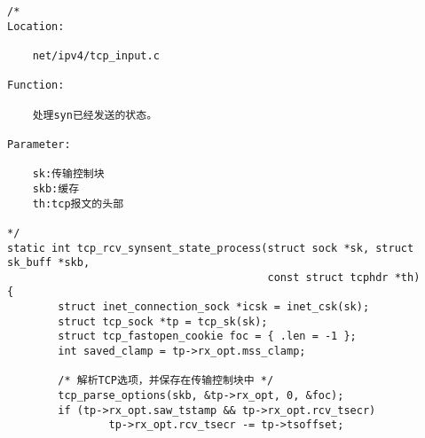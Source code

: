 \begin{verbatim}
/*
Location:

	net/ipv4/tcp_input.c

Function:

	处理syn已经发送的状态。

Parameter:

	sk:传输控制块
	skb:缓存
	th:tcp报文的头部

*/
static int tcp_rcv_synsent_state_process(struct sock *sk, struct sk_buff *skb,
                                         const struct tcphdr *th)
{
        struct inet_connection_sock *icsk = inet_csk(sk);
        struct tcp_sock *tp = tcp_sk(sk);
        struct tcp_fastopen_cookie foc = { .len = -1 };
        int saved_clamp = tp->rx_opt.mss_clamp;

        /* 解析TCP选项，并保存在传输控制块中 */
        tcp_parse_options(skb, &tp->rx_opt, 0, &foc);
        if (tp->rx_opt.saw_tstamp && tp->rx_opt.rcv_tsecr)
                tp->rx_opt.rcv_tsecr -= tp->tsoffset;
\end{verbatim}

